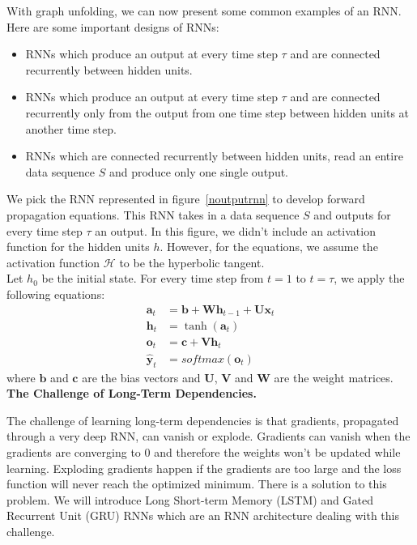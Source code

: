 
With graph unfolding, we can now present some common examples of an RNN. Here are
some important designs of RNNs:


\begin{itemize}
  \item RNNs which produce an output at every time step $\tau$ and are connected
    recurrently between hidden units.
  \item RNNs which produce an output at every time step $\tau$ and are connected
    recurrently only from the output from one time step between hidden units at
    another time step.
  \item RNNs which are connected recurrently between hidden units, read an
    entire data sequence $S$ and produce only one single output.
\end{itemize}



We pick the RNN represented in figure~\ref{noutputrnn} to develop forward
propagation equations. This RNN takes in a data sequence $S$ and outputs for
every time step $\tau$ an output. In this figure, we didn't include an
activation function for the hidden units $h$. However, for the equations, we
assume the activation function $\mathcal{H}$ to be the hyperbolic tangent.\\

Let $h_{0}$ be the initial state. For every time step from $t = 1$ to $t =
\tau$, we apply the following equations:
  \begin{align}
    \bm{a}_{t} & = \bm{b} + \bm{Wh}_{t-1} + \bm{Ux}_{t} \\
    \bm{h}_{t} & = \tanh(\bm{a}_{t}) \\
    \bm{o}_{t} & = \bm c + \bm{Vh}_{t} \\
    \bm{\hat y}_{t} & = softmax(\bm o_{t})
  \end{align}
where $\bm b$ and $\bm c$ are the bias vectors and $\bm U$, $\bm V$ and $\bm W$ are
the weight matrices.\\


\textbf{The Challenge of Long-Term Dependencies.} 

The challenge of learning long-term dependencies is that gradients, propagated
through a very deep RNN, can vanish or explode. Gradients can vanish when the
gradients are converging to $0$ and therefore the weights won't be updated
while learning. Exploding gradients happen if the gradients are too large and
the loss function will never reach the optimized minimum. There is a solution
to this problem. We will introduce Long Short-term Memory (LSTM) and Gated
Recurrent Unit (GRU) RNNs which are an RNN architecture dealing with this
challenge.\cite{doi:10.1162/neco.1997.9.8.1735}
